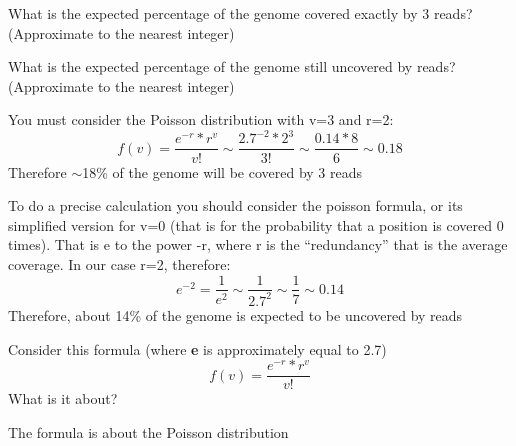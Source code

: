 \begin{Exercise} [
  label={ex32},
  origin={G. Valle}
 ]

\Question What is the expected percentage of the genome covered exactly by 3
reads? (Approximate to the nearest integer)

\Question What is the expected percentage of the genome still uncovered by
reads? (Approximate to the nearest integer)
\end{Exercise}

\begin{Answer} [
  ref={ex32},
  number={1}
 ]

\Question  You must consider the Poisson distribution with v=3 and r=2:
\begin{equation}
f(v) = \frac{e^{-r}*r^v}{v!} \sim \frac{2.7^{-2}*2^3}{3!} \sim 
\frac{0.14 * 8}{6} \sim 0.18
\end{equation}
Therefore $\sim$18\% of the genome will be covered by 3 reads

\Question To do a precise calculation you should consider the poisson formula,
or its simplified version for v=0 (that is for the probability that a position
is covered 0 times). That is e to the power -r, where r is the ``redundancy''
that is the average coverage. In our case r=2, therefore:
\begin{equation}
e^{-2} = \frac{1}{e^2} \sim \frac{1}{2.7^2} \sim \frac{1}{7} \sim 0.14
\end{equation}
Therefore, about 14\% of the genome is expected to be uncovered by reads
\end{Answer}

\begin{Exercise} [
  label={ex33},
  origin={G. Valle}
 ]

\Question Consider this formula (where \textbf{e} is approximately equal to 2.7)
\begin{equation}
f(v) = \frac{e^{-r}*r^v}{v!}
\end{equation}
What is it about?
\end{Exercise}

\begin{Answer} [
  ref={ex33},
  number={1}
 ]

\Question  The formula is about the Poisson distribution 
\end{Answer}
